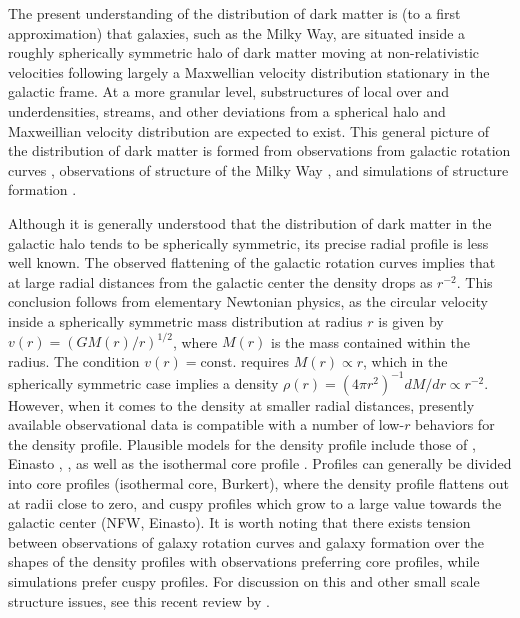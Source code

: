 \documentclass[b5paper, 10pt, twoside]{book}
\begin{document}
The present understanding of the distribution of dark matter is (to a first approximation) that galaxies, such as the Milky Way, are situated inside a roughly spherically symmetric halo of dark matter moving at non-relativistic velocities following largely a Maxwellian velocity distribution stationary in the galactic frame. At a more granular level, substructures of local over and underdensities, streams, and other deviations from a spherical halo and Maxweillian velocity distribution are expected to exist. This general picture of the distribution of dark matter is formed from observations from galactic rotation curves \parencites{SofueEtAl1999, LelliMcGaughSchombert2016}, observations of structure of the Milky Way \parencites{PortailEtAl2016, LabiniEtAl2023, BelokurovEtAl2018, KruijssenEtAl2018, HelmiEtAl2018}, and simulations of structure formation \parencites{VogelsbergerEtAl2014, WangEtAl2015, KlypinEtAl2016, SpringelEtAl2017, SpringelEtAl2008, DiemandEtAl2008, StadelEtAl2009, vandenBoschOgiya2018}.

Although it is generally understood that the distribution of dark matter in the galactic halo tends to be spherically symmetric, its precise radial profile is less well known. The observed flattening of the galactic rotation curves implies that at large radial distances from the galactic center the density drops as $r^{-2}$. This conclusion follows from elementary Newtonian physics, as the circular velocity inside a spherically symmetric mass distribution at radius $r$ is given by $v(r)=(GM(r)/r)^{1/2}$, where $M(r)$ is the mass contained within the radius. The condition $v(r)=\text{const.}$ requires $M(r)\propto r$, which in the spherically symmetric case implies a density $\rho(r)=(4\pi r^2)^{-1}dM/dr\propto r^{-2}$. However, when it comes to the density at smaller radial distances, presently available observational data is compatible with a number of low-$r$ behaviors for the density profile. Plausible models for the density profile include those of \textcite{NavarroFrenkWhite1996}, Einasto \parencites{Einasto1965, MerrittEtAl2006}, \textcite{Burkert1995}, as well as the isothermal core profile \parencites{BahcallSoneira1980, BegemanBroeilsSanders1991}. Profiles can generally be divided into core profiles (isothermal core, Burkert), where the density profile flattens out at radii close to zero, and cuspy profiles which grow to a large value towards the galactic center (NFW, Einasto). It is worth noting that there exists tension between observations of galaxy rotation curves and galaxy formation over the shapes of the density profiles with observations preferring core profiles, while simulations prefer cuspy profiles. For discussion on this and other small scale structure issues, see this recent review by \textcite{TulinYu2018}.
\end{document}
